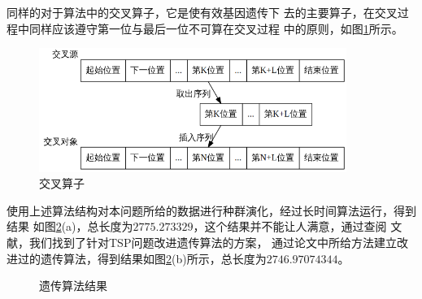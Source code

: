 \documentclass[fontset=windows,a4paper,12pt]{ctexart}
\begin{document}
      同样的对于算法中的交叉算子，它是使有效基因遗传下
      去的主要算子，在交叉过程中同样应该遵守第一位与最后一位不可算在交叉过程
      中的原则，如图\ref{fig:cross}所示。
      \begin{figure}[!htbp]
      	\centering
      	\includegraphics[width=10cm]{pic/life_cross.png}
      	\caption{交叉算子}
      	\label{fig:cross}
      \end{figure}
      
      使用上述算法结构对本问题所给的数据进行种群演化，经过长时间算法运行，得到结果
      如图\ref{fig:ga}(a)，总长度为$2775.273329$，这个结果并不能让人满意，通过查阅
      文献，我们找到了针对TSP问题改进遗传算法的方案\cite{谢胜利2002求解}，
      通过论文中所给方法建立改进过的遗传算法，得到结果如图\ref{fig:ga}(b)所示，总长度为$2746.97074344$。
      \begin{figure}[!htbp]
      	\centering
      	\caption{遗传算法结果}
      	\label{fig:ga}
      \end{figure}
      
\end{document}
